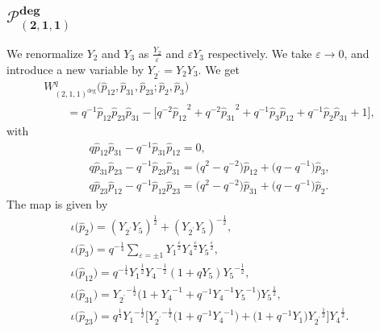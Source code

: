 \documentclass[10pt,a4paper]{amsart}
\numberwithin{equation}{section}
\begin{document}
\subsection[$\mathcal{P}_{(2,1,1)}^{\text{deg}}$]{$\boldsymbol{\mathcal{P}_{(2,1,1)}^{\text{deg}}}$}
We renormalize $Y_2$ and $Y_3$ as $\frac{Y_2}{\varepsilon}$ and $\varepsilon Y_3$ respectively. We take $\varepsilon \to 0 $, and introduce a new variable by $Y_{2^\prime} = Y_2 Y_3$. We get
\begin{gather*}
 W^q_{(2,1,1)^{\text{deg}}}\big(\hat{p}_{12}, \hat{p}_{31}, \hat{p}_{23} ; \hat{p}_2, \hat{p}_3\big) \\
 \qquad{}= q^{-1} \hat{p}_{12} \hat{p}_{23} \hat{p}_{31} - \big[ q^{-2} {\hat{p}_{12}}^{2} + q^{-2} {\hat{p}_{31}}^{2} + q^{-1} \hat{p}_3 \hat{p}_{12} + q^{-1} \hat{p}_2 \hat{p}_{31} + 1 \big],
\end{gather*}
with
\begin{gather*}
q \hat{p}_{12} \hat{p}_{31} - q^{-1} \hat{p}_{31} \hat{p}_{12} =0 , \\
q \hat{p}_{31} \hat{p}_{23} - q^{-1} \hat{p}_{23} \hat{p}_{31} = \big(q^2 - q^{-2}\big) \hat{p}_{12} + \big(q-q^{-1}\big) \hat{p}_3 , \\
q \hat{p}_{23} \hat{p}_{12} - q^{-1} \hat{p}_{12} \hat{p}_{23} = \big(q^2 - q^{-2}\big) \hat{p}_{31} + \big(q-q^{-1}\big) \hat{p}_2 .
\end{gather*}
The map is given by
\begin{gather*}
\iota\big(\hat{p}_2\big) = (Y_{2^\prime} Y_5)^{\frac{1}{2}} + (Y_{2^\prime} Y_5)^{-\frac{1}{2}} , \\
\iota\big(\hat{p}_3\big) = q^{-\frac{1}{4}} \sum_{\varepsilon=\pm 1} {Y_1}^{\frac{\varepsilon}{2}} {Y_4}^{\frac{\varepsilon}{2}} {Y_5}^{\frac{\varepsilon}{2}} , \\
\iota\big(\hat{p}_{12}\big) = q^{-\frac{1}{4}} {Y_1}^{\frac{1}{2}} {Y_4}^{-\frac{1}{2}} ( 1 + q Y_5 ) {Y_5}^{-\frac{1}{2}} , \\
\iota\big(\hat{p}_{31}\big) = {Y_{2^\prime}}^{-\frac{1}{2}} \big( 1 + {Y_4}^{-1} + q^{-1} {Y_4}^{-1} {Y_5}^{-1}\big) {Y_5}^{\frac{1}{2}} , \\
\iota\big(\hat{p}_{23}\big) = q^{\frac{1}{4}} {Y_1}^{-\frac{1}{2}} \big[ {Y_{2^\prime}}^{-\frac{1}{2}} \big( 1 + q^{-1} {Y_4}^{-1} \big) + \big( 1 + q^{-1} Y_1\big) {Y_{2^\prime}}^{\frac{1}{2}}\big] {Y_4}^{\frac{1}{2}} .
\end{gather*}
\end{document}
